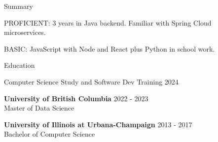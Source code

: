 \documentclass{resume} %
\begin{document}
\begin{skillSection}{Summary}
\item PROFICIENT: 3 years in Java backend. Familiar with Spring Cloud microservices.
\item BASIC: JavaScript with Node and React plus Python in school work.
\end{skillSection}


\begin{rSection}{Education}

{Computer Science Study and Software Dev Training} \hfill {2024}

{\bf University of British Columbia} \hfill {2022 - 2023}
\\ Master of Data Science

{\bf University of Illinois at Urbana-Champaign} \hfill {2013 - 2017}
\\ Bachelor of Computer Science

\end{rSection}

\end{document}
